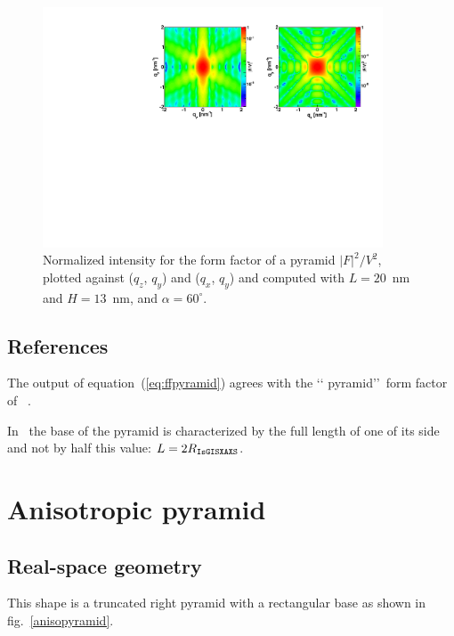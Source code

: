 \begin{figure}[h]
\begin{center}
\includegraphics[width=0.9\textwidth]{Figures/figffpyramid}
\end{center}
\caption{Normalized intensity for the form factor of a
  pyramid $|F|^2/V^2$, plotted against ($q_z$, $q_y$) and  
  ($q_x$, $q_y$) and computed with $L=20$~nm and $H=13$~nm, and $\alpha=60^{\circ}$.}
\label{figFFPyramidEx}
\end{figure}

\FloatBarrier

\subsection{References}
The output of equation~(\ref{eq:ffpyramid}) agrees with the \lq\lq
pyramid\rq\rq ~form factor of \IsGISAXS~\cite{Laz02}.

In \BornAgain\, the base of the pyramid is characterized by the full
length of one of its side and not by half this value: $L=2R_{\rm{\texttt{IsGISXAXS}}}$. 


\newpage{\cleardoublepage}
\section{Anisotropic pyramid}  

\subsection{Real-space geometry}
This shape is a truncated right pyramid with a rectangular base as
shown in fig.~\ref{anisopyramid}.

